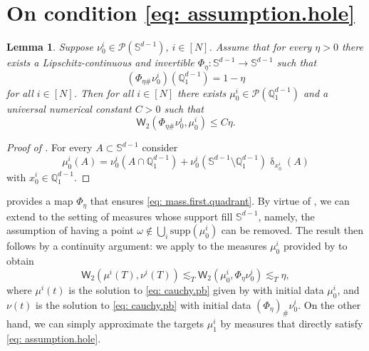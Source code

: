 \documentclass[a4paper,11pt]{article}
\theoremstyle{plain}
\newtheorem{lemma}[theorem]{Lemma}
\newcommand{\supp}{\mathrm{supp}}
\renewcommand{\S}{\mathbb{S}^{d-1}}
\newcommand{\Q}{\mathbb{Q}}
\renewcommand{\leq}{\leqslant}
\numberwithin{equation}{section}
\begin{document}

\section{\texorpdfstring{On condition \eqref{eq: assumption.hole}}{Proof of Lemma}}
\label{appendix: technical}

\begin{lemma} \label{lem: mass.concentration.Q1}
Suppose $\nu_0^i\in \mathscr{P}(\S)$, $i\in[N]$. 
Assume that for every $\eta>0$ there exists a Lipschitz-continuous and invertible $\Phi_\eta:\S\to\S$ such that
\begin{equation}\label{eq: mass.first.quadrant}
    \left(\Phi_{\eta\#} \nu_0^i\right)(\Q_1^{d-1})=1-\eta
\end{equation}
for all $i\in[N]$. Then for all $i\in[N]$ there exists $\mu_0^i\in\mathscr{P}(\Q_1^{d-1})$ and a universal numerical constant $C>0$ such that
\begin{equation*}
    \mathsf{W}_2\left(\Phi_{\eta\#}\nu_0^i, \mu_0^i\right)\leq C\eta.
\end{equation*}
\end{lemma}

\begin{proof}[Proof of ]
   For every $A\subset\S$ consider
    \begin{equation*}
        \mu_0^i(A)=\nu_0^i(A\cap \Q_1^{d-1})+\nu_0^i\left(\S\setminus\Q_1^{d-1}\right)\updelta_{x_0^i}(A)
    \end{equation*}
    with $x_0^i\in\Q_1^{d-1}$. 
\end{proof}

 provides a map $\Phi_\eta$ that ensures \eqref{eq: mass.first.quadrant}. 
By virtue of , we can extend  to the setting of measures whose support fill $\S$, namely, the assumption of having a point $\omega\notin\bigcup_{i}\supp(\mu_0^i)$ can be removed. 
The result then follows by a continuity argument: we apply  to the measures $\mu_0^i$ provided by  to obtain
\begin{equation*}
\mathsf{W}_2\left(\mu^i(T),\nu^i(T)\right)\lesssim_T\mathsf{W}_2\left(\mu_0^i,\Phi_\eta\nu_0^i\right)\lesssim_T \eta,
\end{equation*}
where $\mu^i(t)$ is the solution to \eqref{eq: cauchy.pb} given by  with initial data $\mu_0^i$, and $\nu(t)$ is the solution to \eqref{eq: cauchy.pb} with initial data $(\Phi_\eta)_\#\nu_0^i$.
On the other hand, we can simply approximate the targets $\mu_1^i$ by measures that directly satisfy \eqref{eq: assumption.hole}.
\end{document}
